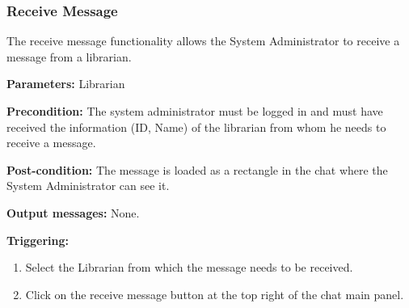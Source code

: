 \subsubsection{Receive Message}

The receive message functionality allows the System
Administrator to receive a message from a librarian.

\begin{description}

\item \textbf{Parameters:} Librarian

\item \textbf{Precondition:} The system administrator must be logged in and must
have received the information (ID, Name) of the librarian from whom he needs to
receive a message.

\item \textbf{Post-condition:} The message is loaded as a rectangle in the chat
where the System Administrator can see it.

\item \textbf{Output messages:} None.

\item \textbf{Triggering:}
\begin{enumerate}

\item Select the Librarian from which the message needs to be received. 

\item Click on the receive message button at the top right of the chat
main panel.
  

\end{enumerate}

\end{description}